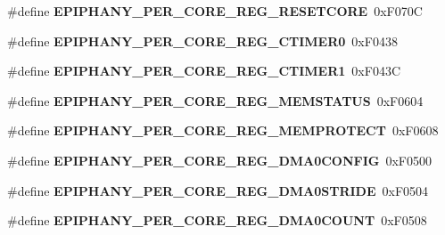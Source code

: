 \begin{DoxyCompactItemize}
\mbox{\label{epiphany-utility_8h_ac47b6be3a5cb3a7c4feafa72ebffe38f}} 
\#define {\bfseries E\+P\+I\+P\+H\+A\+N\+Y\+\_\+\+P\+E\+R\+\_\+\+C\+O\+R\+E\+\_\+\+R\+E\+G\+\_\+\+R\+E\+S\+E\+T\+C\+O\+RE}~0x\+F070C
\item 
\mbox{\label{epiphany-utility_8h_ae0223d3e7f21b76627b08c0cfb364a75}} 
\#define {\bfseries E\+P\+I\+P\+H\+A\+N\+Y\+\_\+\+P\+E\+R\+\_\+\+C\+O\+R\+E\+\_\+\+R\+E\+G\+\_\+\+C\+T\+I\+M\+E\+R0}~0x\+F0438
\item 
\mbox{\label{epiphany-utility_8h_af432be291a7d696344edef55addac282}} 
\#define {\bfseries E\+P\+I\+P\+H\+A\+N\+Y\+\_\+\+P\+E\+R\+\_\+\+C\+O\+R\+E\+\_\+\+R\+E\+G\+\_\+\+C\+T\+I\+M\+E\+R1}~0x\+F043C
\item 
\mbox{\label{epiphany-utility_8h_a91dba4e7f3dbac35446f26022ffe9d07}} 
\#define {\bfseries E\+P\+I\+P\+H\+A\+N\+Y\+\_\+\+P\+E\+R\+\_\+\+C\+O\+R\+E\+\_\+\+R\+E\+G\+\_\+\+M\+E\+M\+S\+T\+A\+T\+US}~0x\+F0604
\item 
\mbox{\label{epiphany-utility_8h_a22eef6f95627c14a1b1ede6f19b5fc9b}} 
\#define {\bfseries E\+P\+I\+P\+H\+A\+N\+Y\+\_\+\+P\+E\+R\+\_\+\+C\+O\+R\+E\+\_\+\+R\+E\+G\+\_\+\+M\+E\+M\+P\+R\+O\+T\+E\+CT}~0x\+F0608
\item 
\mbox{\label{epiphany-utility_8h_ac86a1427406b49114e0baa32492ee52f}} 
\#define {\bfseries E\+P\+I\+P\+H\+A\+N\+Y\+\_\+\+P\+E\+R\+\_\+\+C\+O\+R\+E\+\_\+\+R\+E\+G\+\_\+\+D\+M\+A0\+C\+O\+N\+F\+IG}~0x\+F0500
\item 
\mbox{\label{epiphany-utility_8h_a1d81570a6003577109bc6a86c1d3515c}} 
\#define {\bfseries E\+P\+I\+P\+H\+A\+N\+Y\+\_\+\+P\+E\+R\+\_\+\+C\+O\+R\+E\+\_\+\+R\+E\+G\+\_\+\+D\+M\+A0\+S\+T\+R\+I\+DE}~0x\+F0504
\item 
\mbox{\label{epiphany-utility_8h_a7fc1bb6f62c9a7984c3b000088ac8fab}} 
\#define {\bfseries E\+P\+I\+P\+H\+A\+N\+Y\+\_\+\+P\+E\+R\+\_\+\+C\+O\+R\+E\+\_\+\+R\+E\+G\+\_\+\+D\+M\+A0\+C\+O\+U\+NT}~0x\+F0508
\item 
\mbox{\label{epiphany-utility_8h_a4192c2c6f0f25cdfdb6bf5b545ecb1a1}} 

\end{DoxyCompactItemize}
